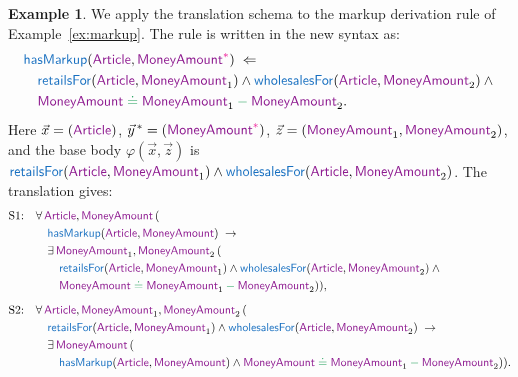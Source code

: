 \documentclass[11pt]{amsart}
\theoremstyle{definition}
\newtheorem{example}{Example}
\theoremstyle{remark}
\newcommand{\pr}[1]{\mathsf{\textcolor{RoyalBlue}{#1}}}
\newcommand{\var}[1]{\mathsf{\textcolor{Plum}{#1}}}
\newcommand{\dataOp}[1]{\mathbin{\textcolor{ForestGreen}{#1}}}
\newcommand{\dataEq}{\mathrel{\textcolor{ForestGreen}{\doteq}}}
\newcommand{\dvar}[1]{\var{#1}^{\textcolor{Magenta}{*}}}
\begin{document}
\begin{example}
\label{ex:markup2}
We apply the translation schema to the markup derivation rule of
Example~\ref{ex:markup}. The rule is written in the new syntax as:
$$\begin{aligned}[t]
  & \pr{hasMarkup}(\var{Article}, \dvar{MoneyAmount}) \;\Leftarrow\; \\
  & \quad \pr{retailsFor}(\var{Article}, \var{MoneyAmount}_1) \wedge
    \pr{wholesalesFor}(\var{Article}, \var{MoneyAmount}_2) \wedge {} \\
  & \quad \var{MoneyAmount} \dataEq
    \var{MoneyAmount}_1 \dataOp{-} \var{MoneyAmount}_2.
\end{aligned}$$
Here $\vec{x} = (\var{Article})$, $\vec{y}^{\,*} = (\dvar{MoneyAmount})$,
$\vec{z} = (\var{MoneyAmount}_1, \var{MoneyAmount}_2)$, and the base body
$\varphi(\vec{x}, \vec{z})$ is
$\pr{retailsFor}(\var{Article}, \var{MoneyAmount}_1) \wedge
\pr{wholesalesFor}(\var{Article}, \var{MoneyAmount}_2)$.
The translation gives:
\begin{align*}
\text{S1:} \quad
  &\forall\, \var{Article}, \var{MoneyAmount} \, ( \\
    & \quad \pr{hasMarkup}(\var{Article}, \var{MoneyAmount}) \;\to \\
  &\quad \exists\, \var{MoneyAmount}_1, \var{MoneyAmount}_2 \, ( \\
   & \qquad \pr{retailsFor}(\var{Article}, \var{MoneyAmount}_1) \wedge \pr{wholesalesFor}(\var{Article}, \var{MoneyAmount}_2) \wedge {} \\
    & \qquad \var{MoneyAmount} \dataEq \var{MoneyAmount}_1 \dataOp{-}
    \var{MoneyAmount}_2 ) ), \\[6pt]
\text{S2:} \quad
  &\forall\, \var{Article}, \var{MoneyAmount}_1, \var{MoneyAmount}_2 \, ( \\
  & \quad \pr{retailsFor}(\var{Article}, \var{MoneyAmount}_1) \wedge \pr{wholesalesFor}(\var{Article}, \var{MoneyAmount}_2) \;\to \\
  & \quad  \exists\, \var{MoneyAmount} \, ( \\
  & \qquad \pr{hasMarkup}(\var{Article}, \var{MoneyAmount}) \wedge
    \var{MoneyAmount} \dataEq \var{MoneyAmount}_1 \dataOp{-}
    \var{MoneyAmount}_2 ) ).
\end{align*}
\end{example}
\end{document}
